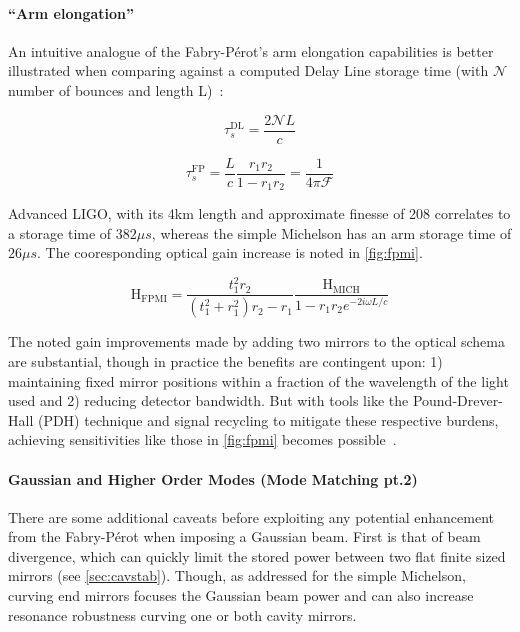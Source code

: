 \paragraph{``Arm elongation''}

An intuitive analogue of the Fabry-P\'{e}rot's arm elongation capabilities is better illustrated when comparing against a computed Delay Line storage time (with $\mathscr{N}$ number of bounces and length L)~\cite{saulson:2017}:

\begin{equation}
    \tau^\mathrm{DL}_s = \frac{2 \mathscr{N} L}{c}
\end{equation}

\begin{equation}
    \tau^\mathrm{FP}_s = \frac{L}{c} \frac{r_1r_2}{1-r_1r_2} = \frac{1}{4 \pi \mathscr{F}}
\end{equation}

Advanced LIGO, with its 4km length and approximate finesse of 208 correlates to a storage time of $382\mu s$, whereas the simple Michelson has an arm storage time of $26 \mu s$. The cooresponding optical gain increase is noted in \autoref{fig:fpmi}. 

\begin{equation}
	\mathrm{H_{FPMI}} = \frac{t_1 ^2 r_2}{(t_1^2 + r_1^2)r_2 - r_1} \frac{\mathrm{H_{MICH}}}{1 - r_1 r_2 e^{-2i \omega L / c}}
\end{equation}

The noted gain improvements made by adding two mirrors to the optical schema are substantial, though in practice the benefits are contingent upon: 1) maintaining fixed mirror positions within a fraction of the wavelength of the light used and 2) reducing detector bandwidth. But with tools like the Pound-Drever-Hall (PDH) technique and signal recycling to mitigate these respective burdens, achieving sensitivities like those in \autoref{fig:fpmi} becomes possible~\cite{black:pdh}.

\paragraph{Gaussian and Higher Order Modes (Mode Matching pt.2)}\label{subsubsubsubsec:mm2}

There are some additional caveats before exploiting any potential enhancement from the Fabry-P\'erot when imposing a Gaussian beam. First is that of beam divergence, which can quickly limit the stored power between two flat finite sized mirrors (see \autoref{sec:cavstab}). Though, as addressed for the simple Michelson, curving end mirrors focuses the Gaussian beam power and can also increase resonance robustness curving one or both cavity mirrors. 

